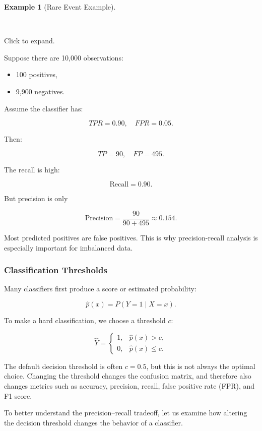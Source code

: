 \documentclass[
  letterpaper,
  DIV=11,
  numbers=noendperiod]{scrreprt}
\providecommand{\tightlist}{%
  \setlength{\itemsep}{0pt}\setlength{\parskip}{0pt}}
\theoremstyle{definition}
\theoremstyle{definition}
\newtheorem{example}{Example}[chapter]
\theoremstyle{plain}
\theoremstyle{plain}
\theoremstyle{remark}
\begin{document}
\begin{example}[Rare Event
Example]\protect\hypertarget{exm-}{}\label{exm-}

~

Click to expand.

Suppose there are 10,000 observations:

\begin{itemize}
\tightlist
\item
  100 positives,
\item
  9,900 negatives.
\end{itemize}

Assume the classifier has:

\[
TPR=0.90,
\quad
FPR=0.05.
\]

Then:

\[
TP=90,
\quad
FP=495.
\]

The recall is high:

\[
\text{Recall}
=
0.90.
\]

But precision is only

\[
\text{Precision}
=
\frac{90}{90+495}
\approx
0.154.
\]

Most predicted positives are false positives. This is why
precision-recall analysis is especially important for imbalanced data.

\end{example}

\subsubsection{Classification
Thresholds}\label{classification-thresholds}

Many classifiers first produce a score or estimated probability:

\[
\hat p(x)=P(Y=1\mid X=x).
\]

To make a hard classification, we choose a threshold \(c\):

\[
\hat Y
=
\begin{cases}
1, & \hat p(x)>c,\\
0, & \hat p(x)\le c.
\end{cases}
\]

The default decision threshold is often \(c=0.5\), but this is not
always the optimal choice. Changing the threshold changes the confusion
matrix, and therefore also changes metrics such as accuracy, precision,
recall, false positive rate (FPR), and F1 score.

To better understand the precision--recall tradeoff, let us examine how
altering the decision threshold changes the behavior of a classifier.
\end{document}
